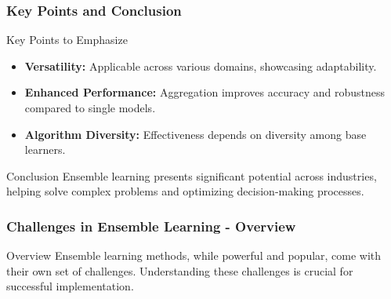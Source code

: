 \documentclass[aspectratio=169]{beamer}
\begin{document}
\begin{frame}[fragile]
  \frametitle{Key Points and Conclusion}
  \begin{block}{Key Points to Emphasize}
    \begin{itemize}
      \item \textbf{Versatility:} Applicable across various domains, showcasing adaptability.
      \item \textbf{Enhanced Performance:} Aggregation improves accuracy and robustness compared to single models.
      \item \textbf{Algorithm Diversity:} Effectiveness depends on diversity among base learners.
    \end{itemize}
  \end{block}

  \begin{block}{Conclusion}
    Ensemble learning presents significant potential across industries, helping solve complex problems and optimizing decision-making processes.
  \end{block}
\end{frame}

\begin{frame}[fragile]
    \frametitle{Challenges in Ensemble Learning - Overview}
    \begin{block}{Overview}
        Ensemble learning methods, while powerful and popular, come with their own set of challenges. Understanding these challenges is crucial for successful implementation.
    \end{block}
\end{frame}
\end{document}
